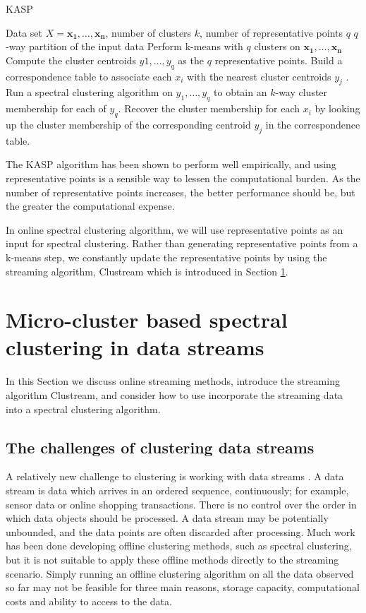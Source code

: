 \begin{algorithm}[h!]
\caption{KASP}
  \begin{algorithmic}[1]
   \REQUIRE Data set $X = {\boldsymbol{x_1},\ldots, \boldsymbol{x_n}  }$, number of clusters $k$, number of representative points $q$
   \ENSURE  $q$-way partition of the input data
   \STATE Perform k-means with $q$ clusters on $\boldsymbol{x_1}, \hdots, \boldsymbol{x_n}$
   \STATE Compute the cluster centroids $y1, \hdots, y_q$ as the $q$ representative points.
   \STATE Build a correspondence table to associate each $x_i$ with the nearest cluster centroids $y_j$ .
   \STATE Run a spectral clustering algorithm on $y_1,\hdots, y_q$ to obtain an $k$-way cluster membership
   for each of $y_q$.
   \STATE Recover the cluster membership for each $x_i$ by looking up the cluster membership of the corresponding centroid $y_j$ in the correspondence table.
  \end{algorithmic}
\label{alg:kasp}
\end{algorithm}

The KASP algorithm has been shown to perform well empirically, and using representative points is a sensible way to lessen the computational burden. As the number of representative points increases, the better performance should be, but the greater the computational expense. 

In online spectral clustering algorithm, we will use representative points as an input for spectral clustering. Rather than  generating representative points from a k-means step, we  constantly update the representative points by using the streaming algorithm, Clustream which is introduced in Section \ref{sec:microSpec}.


\section{Micro-cluster based spectral clustering in data streams}
\label{sec:microSpec}

In this Section we discuss online streaming methods, introduce the streaming algorithm Clustream, and consider how to use incorporate the streaming data into a spectral clustering algorithm.

\subsection{The challenges of clustering data streams}

A relatively new challenge to clustering is working with data streams \cite{Gama2010, Silva2013}. A data stream is data which arrives in an ordered sequence, continuously; for example, sensor data or online shopping transactions. There is no control over the order in which data objects should be processed. A data stream may be potentially unbounded, and the data points are often discarded after processing.  Much work has been done developing offline clustering methods, such as spectral clustering, but it is not suitable to apply these offline methods directly to the streaming scenario. Simply running an offline clustering algorithm on all the data observed so far may not be feasible for three main reasons, storage capacity, computational costs and ability to access to the data.

